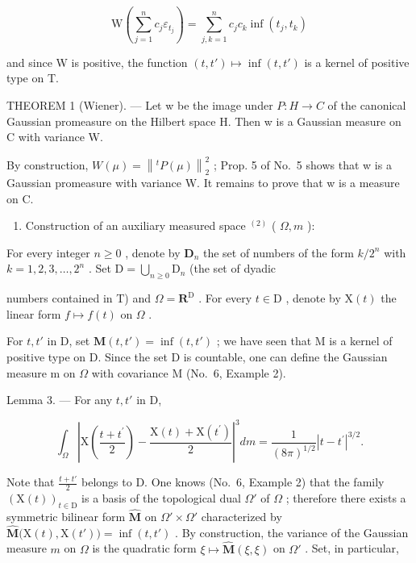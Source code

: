\[
\mathrm{W} \left(\sum_ {j = 1} ^ {n} c _ {j} \varepsilon_ {t _ {j}}\right) = \sum_ {j, k = 1} ^ {n} c _ {j} c _ {k} \inf (t _ {j}, t _ {k})
\]

and since W is positive, the function \((t, t') \mapsto \inf(t, t')\) is a kernel of positive type on T.

THEOREM 1 (Wiener). --- Let w be the image under \(P: H \to C\) of the canonical Gaussian promeasure on the Hilbert space H. Then w is a Gaussian measure on C with variance W.

By construction, \(W(\mu) = \left\|^{t} P(\mu) \right\|_{2}^{2}\) ; Prop. 5 of No.~5 shows that w is a Gaussian promeasure with variance W. It remains to prove that w is a measure on C.

\begin{enumerate}
\def\labelenumi{\Alph{enumi})}
\tightlist
\item
  Construction of an auxiliary measured space \(^{(2)}\) ( \(\Omega, m\) ):
\end{enumerate}

For every integer \(n \geqslant 0\) , denote by \(\mathbf{D}_n\) the set of numbers of the form \(k / 2^n\) with \(k = 1, 2, 3, \ldots, 2^n\) . Set \(\mathrm{D} = \bigcup_{n \geqslant 0} \mathrm{D}_n\) (the set of dyadic

numbers contained in T) and \(\Omega = \mathbf{R}^{\mathrm{D}}\) . For every \(t \in \mathrm{D}\) , denote by \(\mathrm{X}(t)\) the linear form \(f \mapsto f(t)\) on \(\Omega\) .

For \(t, t'\) in D, set \(\mathbf{M}(t, t') = \inf(t, t')\) ; we have seen that M is a kernel of positive type on D. Since the set D is countable, one can define the Gaussian measure m on \(\Omega\) with covariance M (No.~6, Example 2).

Lemma 3. --- For any \(t, t'\) in D,

\[
\int_ {\Omega} \left| \mathrm{X} \left(\frac {t + t ^ {\prime}}{2}\right) - \frac {\mathrm{X} (t) + \mathrm{X} \left(t ^ {\prime}\right)}{2} \right| ^ {3} d m = \frac {1}{(8 \pi) ^ {1 / 2}} | t - t ^ {\prime} | ^ {3 / 2}.\tag{38}
\]

Note that \(\frac{t + t'}{2}\) belongs to D. One knows (No.~6, Example 2) that the family \(\left(\mathrm{X}(t)\right)_{t\in \mathrm{D}}\) is a basis of the topological dual \(\Omega'\) of \(\Omega\) ; therefore there exists a symmetric bilinear form \(\widehat{\mathbf{M}}\) on \(\Omega' \times \Omega'\) characterized by \(\widehat{\mathbf{M}}\big(\mathrm{X}(t),\mathrm{X}(t')\big) = \inf(t,t')\) . By construction, the variance of the Gaussian measure \(m\) on \(\Omega\) is the quadratic form \(\xi \mapsto \widehat{\mathbf{M}}(\xi ,\xi)\) on \(\Omega'\) . Set, in particular,


